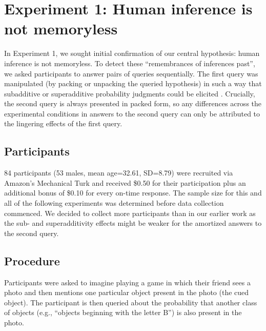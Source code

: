 \section{Experiment 1: Human inference is not memoryless}

In Experiment 1, we sought initial confirmation of our central hypothesis: human inference is not memoryless. To detect these ``remembrances of inferences past'', we asked participants to answer pairs of queries sequentially. The first query was manipulated (by packing or unpacking the queried hypothesis) in such a way that subadditive or superadditive probability judgments could be elicited \citep{dasgupta17}. Crucially, the second query is always presented in packed form, so any differences across the experimental conditions in answers to the second query can only be attributed to the lingering effects of the first query.

\subsection{Participants}

84 participants (53 males, mean age=32.61, SD=8.79) were recruited via Amazon's Mechanical Turk and received \$0.50 for their participation plus an additional bonus of \$0.10 for every on-time response. 
The sample size for this and all of the following experiments was determined before data collection commenced. We decided to collect more participants than in our earlier work \citep{dasgupta17} as the sub- and superadditivity effects might be weaker for the amortized answers to the second query.

\subsection{Procedure}

Participants were asked to imagine playing a game in which their friend sees a photo and then mentions one particular object present in the photo (the cued object). The participant is then queried about the probability that another class of objects (e.g., ``objects beginning with the letter B'') is also present in the photo.

